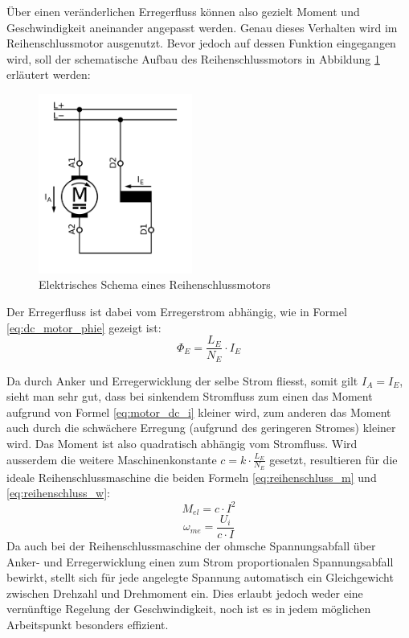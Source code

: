 Über einen veränderlichen Erregerfluss können also gezielt Moment und Geschwindigkeit aneinander angepasst werden. Genau dieses Verhalten wird im Reihenschlussmotor ausgenutzt. Bevor jedoch auf dessen Funktion eingegangen wird, soll der schematische Aufbau des Reihenschlussmotors in Abbildung \ref{fig:reihenschluss} erläutert werden:

\newpage

\begin{figure}[h!]
	\centering
		\includegraphics[width=0.45\textwidth]{images/Reihenschlussmotor.png}
	\caption{Elektrisches Schema eines Reihenschlussmotors \cite{wiki_reihenschlussmotor}}
	\label{fig:reihenschluss}
\end{figure}

Der Erregerfluss ist dabei vom Erregerstrom abhängig, wie in Formel \ref{eq:dc_motor_phie} gezeigt ist:
\begin{equation}
	\Phi_E=\frac{L_E}{N_E}\cdot I_E
\label{eq:dc_motor_phie}
\end{equation}

Da durch Anker und Erregerwicklung der selbe Strom fliesst, somit gilt $I_A=I_E$, sieht man sehr gut, dass bei sinkendem Stromfluss zum einen das Moment aufgrund von Formel \ref{eq:motor_dc_i} kleiner wird, zum anderen das Moment auch durch die schwächere Erregung (aufgrund des geringeren Stromes) kleiner wird. Das Moment ist also quadratisch abhängig vom Stromfluss. Wird ausserdem die weitere Maschinenkonstante $c=k\cdot\frac{L_E}{N_E}$ gesetzt, resultieren für die ideale Reihenschlussmaschine die beiden Formeln \ref{eq:reihenschluss_m} und \ref{eq:reihenschluss_w}:
\begin{equation}
	M_{el}=c\cdot I^2
\label{eq:reihenschluss_m}
\end{equation}
\begin{equation}
	\omega_{me}=\frac{U_i}{c\cdot I}
\label{eq:reihenschluss_w}
\end{equation}
Da auch bei der Reihenschlussmaschine der ohmsche Spannungsabfall über Anker- und Erregerwicklung einen zum Strom proportionalen Spannungsabfall bewirkt, stellt sich für jede angelegte Spannung automatisch ein Gleichgewicht zwischen Drehzahl und Drehmoment ein. Dies erlaubt jedoch weder eine vernünftige Regelung der Geschwindigkeit, noch ist es in jedem möglichen Arbeitspunkt besonders effizient.


